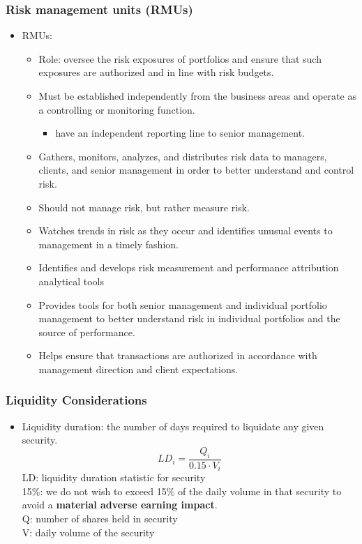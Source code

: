 \subsubsection{Risk management units (RMUs)}
\begin{itemize}
\item RMUs:
    \begin{itemize}
    \item Role: oversee the risk exposures of portfolios and ensure that such exposures are authorized and in line with risk budgets.
    \item Must be established independently from the business areas and operate as a controlling or monitoring function.
        \begin{itemize}
        \item have an independent reporting line to senior management.
        \end{itemize}
    \item Gathers, monitors, analyzes, and distributes risk data to managers, clients, and senior management in order to better understand and control risk.
    \item Should not manage risk, but rather measure risk.
    \item Watches trends in risk as they occur and identifies unusual events to management in a timely fashion.
    \item Identifies and develops risk measurement and performance attribution analytical tools
    \item Provides tools for both senior management and individual portfolio management to better understand risk in individual portfolios and the source of performance.
    \item Helps ensure that transactions are authorized in accordance with management direction and client expectations.
    \end{itemize}
    
\end{itemize}



\subsubsection{Liquidity Considerations}
\begin{itemize}
\item Liquidity duration: the number of days required to liquidate any given security.
\[
LD_i = \frac{Q_i}{0.15 \cdot V_i}
\]
LD: liquidity duration statistic for security\\
15\%: we do not wish to exceed 15\% of the daily volume in that security to avoid a \textbf{material adverse earning impact}.\\
Q: number of shares held in security\\
V: daily volume of the security
\end{itemize}




